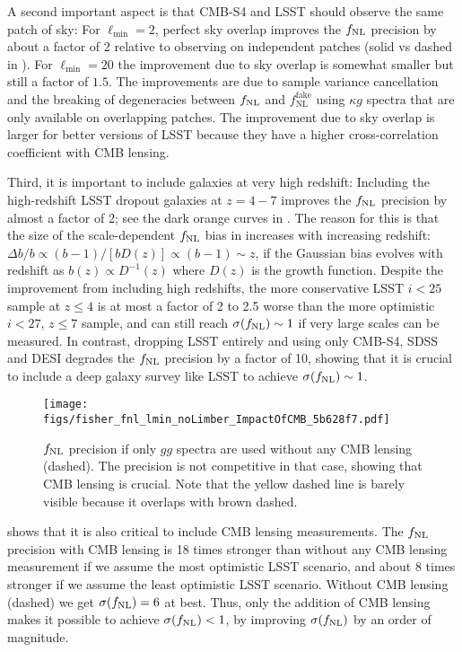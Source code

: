 \documentclass[prd,superscriptaddress,floatfix,notitlepage,nofootinbib,reprint]{revtex4-1} %
\begin{document}
A second important aspect is that CMB-S4 and LSST should observe the same patch of sky:
For $\ell_\mathrm{min}=2$, perfect sky overlap improves the ${f_\mathrm{NL}}$ precision by about a factor of 2 relative to observing on independent patches (solid vs dashed in ).
For $\ell_\mathrm{min}=20$ the improvement due to sky overlap is somewhat smaller but still a factor of $1.5$.
The improvements are due to sample variance cancellation and the breaking of degeneracies between ${f_\mathrm{NL}}$ and $f_\mathrm{NL}^\mathrm{fake}$ using $\kappa g$ spectra that are only available on overlapping patches.
The improvement due to sky overlap is larger for better versions of LSST because they have a higher cross-correlation coefficient with CMB lensing.  

Third, it is important to include galaxies at very high redshift:
Including the high-redshift LSST dropout galaxies at $z=4-7$ improves the ${f_\mathrm{NL}}$ precision by almost a factor of 2; see the dark orange curves in .
The reason for this is that the size of the scale-dependent ${f_\mathrm{NL}}$ bias in  increases with increasing redshift: $\Delta b/b\propto (b-1)/[bD(z)]\propto (b-1)\sim z$, if the Gaussian bias evolves with redshift as $b(z)\propto D^{-1}(z)$ where $D(z)$ is the growth function.
Despite the improvement from including high redshifts, the more conservative LSST $i<25$ sample at $z\le 4$ is at most a factor of 2 to 2.5 worse than the more optimistic $i<27$, $z\le 7$ sample, and can still reach $\sigma({f_\mathrm{NL}})\sim 1$ if very large scales can be measured.
In contrast, dropping LSST entirely and using only CMB-S4, SDSS and DESI degrades the ${f_\mathrm{NL}}$ precision by a factor of 10, showing that it is crucial to include a deep galaxy survey like LSST to achieve $\sigma({f_\mathrm{NL}})\sim 1$.




\begin{figure}[tbp]
\texttt{[image: figs/fisher\_fnl\_lmin\_noLimber\_ImpactOfCMB\_5b628f7.pdf]}
\caption{${f_\mathrm{NL}}$ precision if only $gg$ spectra are used without any CMB lensing (dashed).
The precision is not competitive in that case, showing that CMB lensing is crucial.
Note that the yellow dashed line is barely visible because it overlaps with brown dashed.
}
\label{fig:fnl_lmin_CMBImpact}
\end{figure}


 shows that it is also critical to include CMB lensing measurements. 
The ${f_\mathrm{NL}}$ precision with CMB lensing is 18 times stronger than without any CMB lensing measurement if we assume the most optimistic LSST scenario, and about 8 times stronger if we assume the least optimistic LSST scenario.
Without CMB lensing (dashed) we get $\sigma({f_\mathrm{NL}})=6$ at best.
Thus, only the addition of CMB lensing makes it possible to achieve $\sigma({f_\mathrm{NL}})<1$, by improving $\sigma({f_\mathrm{NL}})$ by an order of magnitude.
\end{document}
